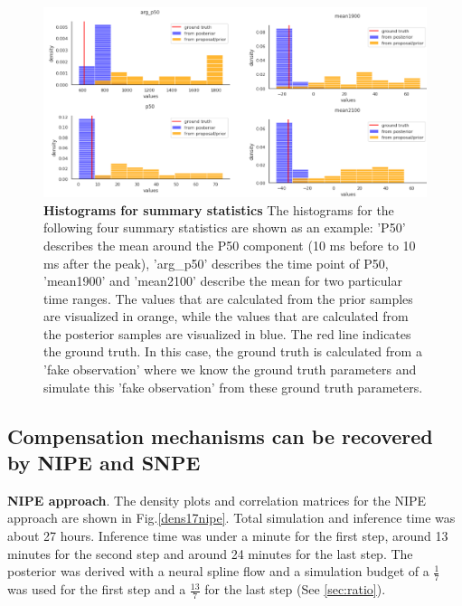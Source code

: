\documentclass[12pt]{extreport}
\begin{document}
\begin{figure}[h]
 \centering

        \includegraphics[width=0.99\linewidth]{images/histo_selection2.png}
        
        
\caption{\label{histo1}\textbf{Histograms for summary statistics} \small The histograms for the following four summary statistics are shown as an example: 'P50' describes the mean around the P50 component (10 ms before to 10 ms after the peak), 'arg\_p50' describes the time point of P50, 'mean1900' and 'mean2100' describe the mean for two particular time ranges. The values that are calculated from the prior samples are visualized in orange, while the values that are calculated from the posterior samples are visualized in blue. The red line indicates the ground truth. In this case, the ground truth is calculated from a 'fake observation' where we know the ground truth parameters and simulate this 'fake observation' from these ground truth parameters.}

\end{figure}

\subsection{Compensation mechanisms can be recovered by NIPE and SNPE } 



\textbf{NIPE approach}. The density plots and correlation matrices for the NIPE approach are shown in Fig.\ref{dens17nipe}. Total simulation and inference time was about 27 hours. Inference time was under a minute for the first step, around 13 minutes for the second step and around 24 minutes for the last step. The posterior was derived with a neural spline flow \citep{durkan2019neural} and a simulation budget of a $\frac{1}{7}$ was used for the first step and a $\frac{13}{7}$ for the last step (See \ref{sec:ratio}). 
\end{document}
